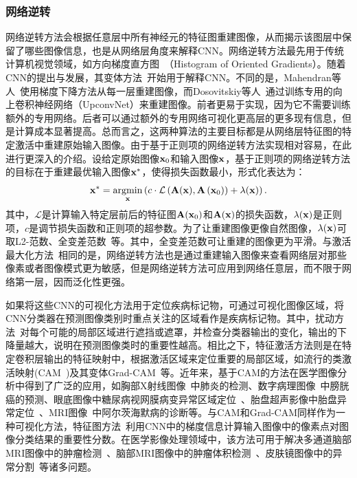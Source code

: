 \subsubsection*{网络逆转}
网络逆转方法会根据任意层中所有神经元的特征图重建图像，从而揭示该图层中保留了哪些图像信息，也是从网络层角度来解释CNN。网络逆转方法最先用于传统计算机视觉领域，如方向梯度直方图~\cite{dalal2005histograms}（Histogram of Oriented Gradients）。随着CNN的提出与发展，其变体方法~\cite{mahendran2015understanding, mahendran2016visualizing, dosovitskiy2016inverting}开始用于解释CNN。不同的是，Mahendran等人~\cite{mahendran2015understanding, mahendran2016visualizing}使用梯度下降方法从每一层重建图像，而Dosovitskiy等人~\cite{dosovitskiy2016inverting}通过训练专用的向上卷积神经网络（UpconvNet）来重建图像。前者更易于实现，因为它不需要训练额外的专用网络。后者可以通过额外的专用网络可视化更高层的更多现有信息，但是计算成本显著提高。总而言之，这两种算法的主要目标都是从网络层特征图的特定激活中重建原始输入图像。由于基于正则项的网络逆转方法实现相对容易，在此进行更深入的介绍。设给定原始图像$\mathbf{x}_0$和输入图像$\mathbf{x}$，基于正则项的网络逆转方法的目标在于重建最优输入图像$\mathbf{x}^*$，使得损失函数最小，形式化表达为：
\begin{equation}
\mathbf{x}^{*}=\underset{\mathbf{x}}{\operatorname{argmin}}\left(c \cdot \mathcal{L}\left(\mathbf{A}(\mathbf{x}), \mathbf{A}\left(\mathbf{x}_{0}\right)\right)+\lambda(\mathbf{x})\right).
\end{equation}
其中，$\mathcal{L}$是计算输入特定层前后的特征图$\mathbf{A}(\mathbf{x}_0)$和$\mathbf{A}(\mathbf{x})$的损失函数，$\lambda(\mathbf{x})$是正则项，$c$是调节损失函数和正则项的超参数。为了让重建图像更像自然图像，$\lambda(\mathbf{x})$可取L2-范数、全变差范数~\cite{rudin1992nonlinear}等。其中，全变差范数可让重建的图像更为平滑。与激活最大化方法~\cite{simonyan2013deep}相同的是，网络逆转方法也是通过重建输入图像来查看网络层对那些像素或者图像模式更为敏感，但是网络逆转方法可应用到网络任意层，而不限于网络第一层，因而泛化性更强。

如果将这些CNN的可视化方法用于定位疾病标记物，可通过可视化图像区域，将CNN分类器在预测图像类别时重点关注的区域看作是疾病标记物。其中，扰动方法~\cite{zintgraf2017visualizing}对每个可能的局部区域进行遮挡或遮罩，并检查分类器输出的变化，输出的下降量越大，说明在预测图像类时的重要性越高。相比之下，特征激活方法则是在特定卷积层输出的特征映射中，根据激活区域来定位重要的局部区域，如流行的类激活映射(CAM~\cite{zhou2016learning})及其变体Grad-CAM~\cite{selvaraju2017grad}等。近年来，基于CAM的方法在医学图像分析中得到了广泛的应用，如胸部X射线图像~\cite{rajpurkar2017chexnet}中肺炎的检测、数字病理图像~\cite{zhang2017mdnet}中膀胱癌的预测、眼底图像中糖尿病视网膜病变异常区域定位~\cite{Gondaletal17}、胎盘超声影像中胎盘异常定位~\cite{Qi2017WeaklySL}、MRI图像~\cite{yang2018visual}中阿尔茨海默病的诊断等。与CAM和Grad-CAM同样作为一种可视化方法，特征图方法~\cite{simonyan2013deep}利用CNN中的梯度信息计算输入图像中的像素点对图像分类结果的重要性分数。在医学影像处理领域中，该方法可用于解决多通道脑部MRI图像中的肿瘤检测~\cite{banerjee2016novel}、脑部MRI图像中的肿瘤体积检测~\cite{mitra2017volumetric}、皮肤镜图像中的异常分割~\cite{jahanifar2018supervised}等诸多问题。

